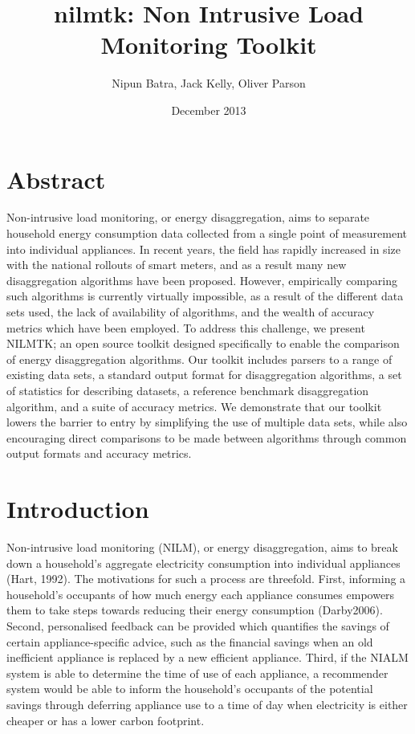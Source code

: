 \documentclass{sig-alternate}
\title{nilmtk: Non Intrusive Load Monitoring Toolkit}
\author{Nipun Batra, Jack Kelly, Oliver Parson}
\date{December 2013}
\begin{document}
\maketitle

\section{Abstract}
Non-intrusive load monitoring, or energy disaggregation, aims to separate household energy consumption data collected from a single point of measurement into individual appliances. In recent years, the field has rapidly increased in size with the national rollouts of smart meters, and as a result many new disaggregation algorithms have been proposed. However, empirically comparing such algorithms is currently virtually impossible, as a result of the different data sets used, the lack of availability of algorithms, and the wealth of accuracy metrics which have been employed. To address this challenge, we present NILMTK; an open source toolkit designed specifically to enable the comparison of energy disaggregation algorithms. Our toolkit includes parsers to a range of existing data sets, a standard output format for disaggregation algorithms, a set of statistics for describing datasets, a reference benchmark disaggregation algorithm, and a suite of accuracy metrics. We demonstrate that our toolkit lowers the barrier to entry by simplifying the use of multiple data sets, while also encouraging direct comparisons to be made between algorithms through common output formats and accuracy metrics.

\section{Introduction}
Non-intrusive load monitoring (NILM), or energy disaggregation, aims to break down a household's aggregate electricity consumption into individual appliances (Hart, 1992). The motivations for such a process are threefold. First, informing a household's occupants of how much energy each appliance consumes empowers them to take steps towards reducing their energy consumption (Darby2006). Second, personalised feedback can be provided which quantifies the savings of certain appliance-specific advice, such as the financial savings when an old inefficient appliance is replaced by a new efficient appliance. Third, if the NIALM system is able to determine the time of use of each appliance, a recommender system would be able to inform the household's occupants of the potential savings through deferring appliance use to a time of day when electricity is either cheaper or has a lower carbon footprint.
\end{document}
